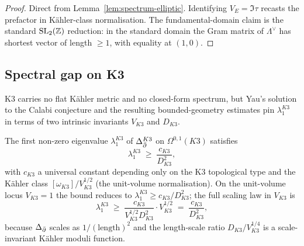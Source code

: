 \begin{proof}
Direct from Lemma~\ref{lem:spectrum-elliptic}. Identifying
$V_E = \Im\tau$ recasts the prefactor in K\"ahler-class normalisation.
The fundamental-domain claim is the standard $\mathrm{SL}_2(\mathbb{Z})$
reduction: in the standard domain the Gram matrix of
$\Lambda^\vee$ has shortest vector of length $\geq 1$, with equality at
$(1,0)$.
\end{proof}

\subsection{Spectral gap on K3}
\label{subsec:gap-K3}

K3 carries no flat K\"ahler metric and no closed-form spectrum, but
Yau's solution to the Calabi conjecture and the resulting
bounded-geometry estimates pin $\lambda_1^{K3}$ in terms of two
intrinsic invariants $V_{K3}$ and $D_{K3}$.

\begin{proposition}
\label{prop:lambda1-K3}
\ClaimStatusProposition{}
The first non-zero eigenvalue $\lambda_1^{K3}$ of $\Delta_{\bar\partial}^{K3}$
on $\Omega^{0,1}(K3)$ satisfies
\begin{equation}
\label{eq:lambda1-K3-Yau-bound}
 \lambda_1^{K3} \;\geq\; \frac{c_{K3}}{D_{K3}^2},
\end{equation}
with $c_{K3}$ a universal constant depending only on the K3 topological
type and the K\"ahler class $[\omega_{K3}]/V_{K3}^{1/2}$ \textup{(}the
unit-volume normalisation\textup{).} On the unit-volume locus
$V_{K3} = 1$ the bound reduces to $\lambda_1^{K3} \geq c_{K3}/D_{K3}^2$;
the full scaling law in $V_{K3}$ is
\begin{equation}
\label{eq:lambda1-K3-scaling}
 \lambda_1^{K3} \;\geq\; \frac{c_{K3}}{V_{K3}^{1/2} D_{K3}^2}
 \cdot V_{K3}^{1/2}
 \;=\; \frac{c_{K3}}{D_{K3}^2},
\end{equation}
because $\Delta_{\bar\partial}$ scales as $1/(\text{length})^2$ and the
length-scale ratio $D_{K3}/V_{K3}^{1/4}$ is a scale-invariant K\"ahler
moduli function.
\end{proposition}

